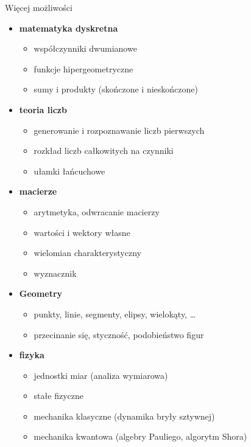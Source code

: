 \documentclass[10pt]{beamer}
\begin{document}
\begin{frame}{Więcej możliwości}
  \scriptsize
  \begin{multicols}{2}
    \begin{itemize}
      \item \textbf{matematyka dyskretna}
        \begin{itemize}
          \tiny
          \item współczynniki dwumianowe
          \item funkcje hipergeometryczne
          \item sumy i produkty (skończone i nieskończone)
      \end{itemize}
      \item \textbf{teoria liczb}
        \begin{itemize}
          \tiny
          \item generowanie i rozpoznawanie liczb pierwszych
          \item rozkład liczb całkowitych na czynniki
          \item ułamki łańcuchowe
        \end{itemize}
      \item \textbf{macierze}
        \begin{itemize}
          \tiny
          \item arytmetyka, odwracanie macierzy
          \item wartości i wektory własne
          \item wielomian charakterystyczny
          \item wyznacznik
        \end{itemize}
      \item \textbf{Geometry}
        \begin{itemize}
          \tiny
          \item punkty, linie, segmenty, elipsy, wielokąty, \ldots
          \item przecinanie się, styczność, podobieństwo figur
        \end{itemize}
      \item \textbf{fizyka}
        \begin{itemize}
          \tiny
          \item jednostki miar (analiza wymiarowa)
          \item stałe fizyczne
          \item mechanika klasyczne (dynamika bryły sztywnej)
          \item mechanika kwantowa (algebry Pauliego, algorytm Shora)

\end{itemize}
\end{itemize}
\end{multicols}
\end{frame}
\end{document}
